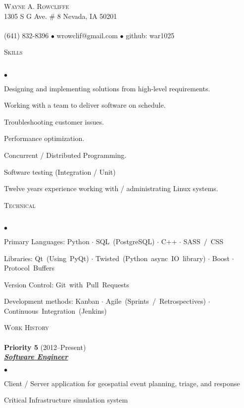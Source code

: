 \documentclass{article}
\newcommand{\lineunder} {
	\vspace*{-8pt} \\ \hspace*{-18pt} \hrulefill \\
}
\newcommand{\header}[1] {
	{\hspace*{-15pt}\vspace*{6pt} \textsc{#1}} \vspace*{-6pt} \lineunder
}
\newcommand{\employer}[3] {
	{ \textbf{#1} (#2)\\ \underline{\textbf{\emph{#3}}}\\  }
}
\newcommand{\contact}[4] {
	\vspace*{-8pt}\begin{center}{\LARGE \scshape {#1}}\\#2 \lineunder#3 $\bullet$ #4\end{center}\vspace*{-8pt}
}
\newenvironment{achievements} {
	\begin{list}{$\bullet$}
		{\topsep 0pt \itemsep -2pt}
	}{
		\vspace*{4pt}\end{list}
	}
\newcommand{\subject}[1] {\mbox{#1} $\cdot$}
\newcommand{\lastsubject}[1] {\mbox{#1}}
\begin{document}
\small
\smallskip
\vspace*{-44pt}

\contact{Wayne A. Rowcliffe}
{1305 S G Ave. \# 8 Nevada, IA 50201}
{(641) 832-8396 $\bullet$ wrowclif@gmail.com}%
{github: war1025}

\header{Skills}

	\begin{achievements}
      \item{Designing and implementing solutions from high-level requirements.}
      \item{Working with a team to deliver software on schedule.}
      \item{Troubleshooting customer issues.}
      \item{Performance optimization.}
      \item{Concurrent / Distributed Programming.}
      \item{Software testing (Integration / Unit)}
		\item{Twelve years experience working with / administrating Linux systems.}
   \end{achievements}

\header{Technical}

   \begin{achievements}
		\item{Primary Languages:
			\subject{Python}
         \subject{SQL (PostgreSQL)}
			\subject{C++}
			\lastsubject{SASS / CSS}
		}
		\item{Libraries:
         \subject{Qt (Using PyQt)}
         \subject{Twisted (Python async IO library)}
			\subject{Boost}
			\lastsubject{Protocol Buffers}
		}
      \item{Version Control:
         \lastsubject{Git with Pull Requests}
      }
      \item{Development methods:
         \subject{Kanban}
         \subject{Agile (Sprints / Retrospectives)}
         \lastsubject{Continuous Integration (Jenkins)}
      }
	\end{achievements}

\header{Work History}

	\employer{Priority 5}{2012--Present}{Software Engineer}
		\begin{achievements}
         \item{Client / Server application for geospatial event planning, triage, and response}
         \item{Critical Infrastructure simulation system}
		\end{achievements}
\end{document}
